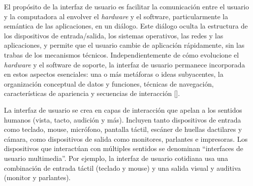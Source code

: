 

El propósito de la interfaz de usuario es facilitar la comunicación entre el usuario y la computadora al envolver el \textit{hardware} y el software, particularmente la semántica de las aplicaciones, en un diálogo. Este diálogo oculta la estructura de los dispositivos de entrada/salida, los sistemas operativos, las redes y las aplicaciones, y permite que el usuario cambie de aplicación rápidamente, sin las trabas de los mecanismos técnicos. Independientemente de cómo evolucione el \textit{hardware} y el software de soporte, la interfaz de usuario permanece incorporada en estos aspectos esenciales: una o más metáforas o ideas subyacentes, la organización conceptual de datos y funciones, técnicas de navegación, características de apariencia y secuencias de interacción [\cite{26}].

La interfaz de usuario se crea en capas de interacción que apelan a los sentidos humanos (vista, tacto, audición y más). Incluyen tanto dispositivos de entrada como teclado, mouse, micrófono, pantalla táctil, escáner de huellas dactilares y cámara, como dispositivos de salida como monitores, parlantes e impresoras. Los dispositivos que interactúan con múltiples sentidos se denominan ``interfaces de usuario multimedia''. Por ejemplo, la interfaz de usuario cotidiana usa una combinación de entrada táctil (teclado y mouse) y una salida visual y auditiva (monitor y parlantes).

